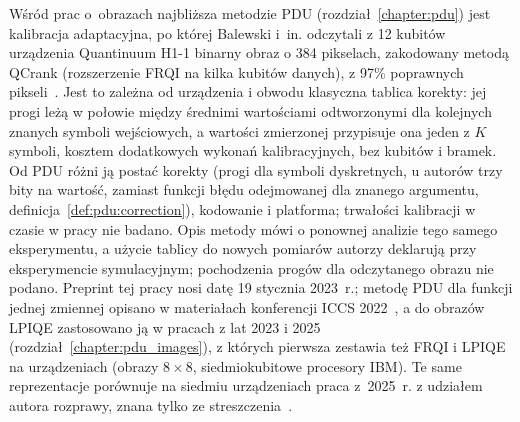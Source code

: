 Wśród prac o~obrazach najbliższa metodzie PDU (rozdział~\ref{chapter:pdu}) jest kalibracja adaptacyjna, po której Balewski i~in. odczytali z 12 kubitów urządzenia Quantinuum \mbox{H1-1} binarny obraz o 384 pikselach, zakodowany metodą QCrank (rozszerzenie FRQI na kilka kubitów danych), z 97\% poprawnych pikseli~\cite{balewski_quantum-parallel_2024}.
Jest to zależna od urządzenia i obwodu klasyczna tablica korekty: jej progi leżą w połowie między średnimi wartościami odtworzonymi dla kolejnych znanych symboli wejściowych, a wartości zmierzonej przypisuje ona jeden z $K$ symboli, kosztem dodatkowych wykonań kalibracyjnych, bez kubitów i bramek.
Od PDU różni ją postać korekty (progi dla symboli dyskretnych, u autorów trzy bity na wartość, zamiast funkcji błędu odejmowanej dla znanego argumentu, definicja~\ref{def:pdu:correction}), kodowanie i platforma; trwałości kalibracji w czasie w pracy nie badano.
Opis metody mówi o ponownej analizie tego samego eksperymentu, a użycie tablicy do nowych pomiarów autorzy deklarują przy eksperymencie symulacyjnym; pochodzenia progów dla odczytanego obrazu nie podano.
Preprint tej pracy nosi datę 19 stycznia 2023~r.; metodę PDU dla funkcji jednej zmiennej opisano w materiałach konferencji ICCS 2022~\cite{werner_experiment_driven_2022}, a do obrazów LPIQE zastosowano ją w pracach z lat 2023 i 2025~\cite{werner_data_loss_2023,werner_error_reduction_2025} (rozdział~\ref{chapter:pdu_images}), z których pierwsza zestawia też FRQI i LPIQE na urządzeniach (obrazy $8\times8$, siedmiokubitowe procesory IBM).
Te same reprezentacje porównuje na siedmiu urządzeniach praca z~2025~r. z udziałem autora rozprawy, znana tylko ze streszczenia~\cite{kordasz_image_encoding_2025}.

